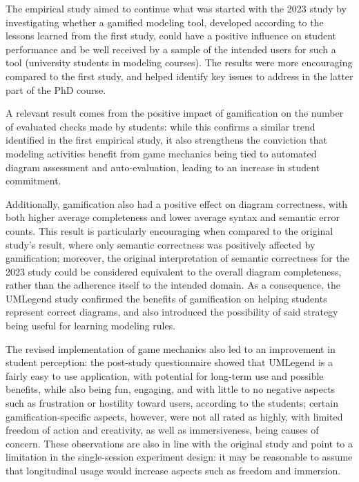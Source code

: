The empirical study aimed to continue what was started with the 2023 study by investigating whether a gamified modeling tool, developed according to the lessons learned from the first study, could have a positive influence on student performance and be well received by a sample of the intended users for such a tool (university students in modeling courses). The results were more encouraging compared to the first study, and helped identify key issues to address in the latter part of the PhD course. 

A relevant result comes from the positive impact of gamification on the number of evaluated checks made by students: while this confirms a similar trend identified in the first empirical study, it also strengthens the conviction that modeling activities benefit from game mechanics being tied to automated diagram assessment and auto-evaluation, leading to an increase in student commitment.

Additionally, gamification also had a positive effect on diagram correctness, with both higher average completeness and lower average syntax and semantic error counts. This result is particularly encouraging when compared to the original study's result, where only semantic correctness was positively affected by gamification; moreover, the original interpretation of semantic correctness for the 2023 study could be considered equivalent to the overall diagram completeness, rather than the adherence itself to the intended domain. As a consequence, the UMLegend study confirmed the benefits of gamification on helping students represent correct diagrams, and also introduced the possibility of said strategy being useful for learning modeling rules. 

The revised implementation of game mechanics also led to an improvement in student perception: the post-study questionnaire showed that UMLegend is a fairly easy to use application, with potential for long-term use and possible benefits, while also being fun, engaging, and with little to no negative aspects such as frustration or hostility toward users, according to the students; certain gamification-specific aspects, however, were not all rated as highly, with limited freedom of action and creativity, as well as immersiveness, being causes of concern. These observations are also in line with the original study and point to a limitation in the single-session experiment design: it may be reasonable to assume that longitudinal usage would increase aspects such as freedom and immersion.

